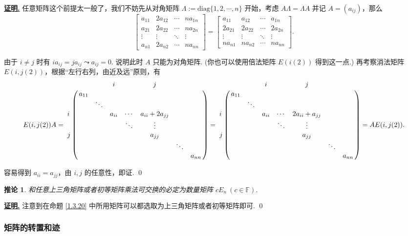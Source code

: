 \documentclass[10pt,openany]{article}
\theoremstyle{thmstyle} %
\theoremstyle{defstyle} %
\newtheorem{corollary}[theorem]{推论}
\theoremstyle{prostyle} %
\theoremstyle{exastyle}
\theoremstyle{remstyle}
\renewenvironment{proof}[1][证明]{\par\underline{\textbf{#1.}} \;\fangsong}{\qed\par}
\newcommand{\F}{\mathbb{F}}
\begin{document}
\begin{proof}
	任意矩阵这个前提太一般了，我们不妨先从对角矩阵 \( \Lambda:=\mathrm{diag}\{1,2,\cdots,n\} \) 开始，考虑 \( A\Lambda=\Lambda A \) 并记 \( A=(a_{ij}) \)，那么
	\[ \begin{bmatrix}
		a_{11} & 2a_{12} & \cdots & na_{1n} \\
		a_{21} & 2a_{22} & \cdots & na_{2n} \\
		\vdots & \vdots & \ddots & \vdots \\
		a_{n1} & 2a_{n2} & \cdots & na_{nn}
	\end{bmatrix}=\begin{bmatrix}
		a_{11} & a_{12} & \cdots & a_{1n} \\
		2a_{21} & 2a_{22} & \cdots & 2a_{2n} \\
	    \vdots & \vdots & \ddots & \vdots \\
	    na_{n1} & na_{n2} & \cdots & na_{nn}
	\end{bmatrix}. \]
	
	由于 \( i \neq j \) 时有 \( ia_{ij}=ja_{ij} \leadsto a_{ij}=0 \). 说明此时 \( A \) 只能为对角矩阵. (你也可以使用倍法矩阵 \( E(i(2)) \) 得到这一点.) 再考察消法矩阵 \( E(i,j(2)) \)，根据“左行右列，由近及远”原则，有
	\[ E(i,j(2))A= \bordermatrix{
		& & & \textbf{\(i\)} & & \textbf{\(j\)} & & \cr
		& a_{11} & & & & & &  \cr
		& & \ddots & & & & &  \cr
		\textbf{\(i\)}	& & & a_{ii} & \cdots & a_{ii}+2a_{jj} & &  \cr
		& & & & \ddots & \vdots & &  \cr
		\textbf{\(j\)}	& & & & & a_{jj} & &  \cr
		& & & & & & \ddots  &  \cr
		& & & & & & & a_{nn} \cr
	}= \bordermatrix{
	& & & \textbf{\(i\)} & & \textbf{\(j\)} & & \cr
	& a_{11} & & & & & &  \cr
	& & \ddots & & & & &  \cr
	\textbf{\(i\)}	& & & a_{ii} & \cdots & 2a_{ii}+a_{jj} & &  \cr
	& & & & \ddots & \vdots & &  \cr
	\textbf{\(j\)}	& & & & & a_{jj} & &  \cr
	& & & & & & \ddots  &  \cr
	& & & & & & & a_{nn} \cr
	}=AE(i,j(2)). \]
	
	容易得到 \( a_{ii}=a_{jj} \)，由 \( i,j \) 的任意性，即证.
\end{proof}

\begin{corollary}
	和任意上三角矩阵或者初等矩阵乘法可交换的必定为数量矩阵 \( cE_n  \ (c \in \F) \).
\end{corollary}

\begin{proof}
	注意到在命题 \ref{1.3.20} 中所用矩阵可以都选取为上三角矩阵或者初等矩阵即可.
\end{proof}


\subsubsection{矩阵的转置和迹}
\end{document}
